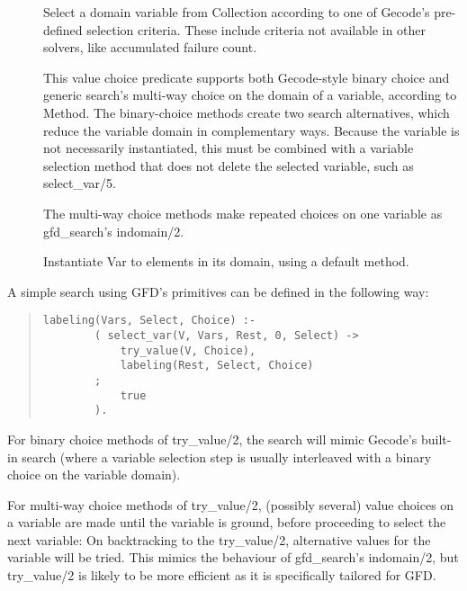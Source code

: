 \begin{description}
\item[]
Select a domain variable from Collection according to one of Gecode's
pre-defined selection criteria.  These include criteria not available in
other {\eclipse} solvers, like accumulated failure count.

\item[]
This value choice predicate supports both Gecode-style binary choice and 
generic search's multi-way choice on the domain of a variable,
according to Method.
The binary-choice methods create two search alternatives, which reduce the variable domain
in complementary ways.  Because the variable is not necessarily instantiated,
this must be combined with a variable selection method that does not delete
the selected variable, such as select_var/5.

The multi-way choice methods make repeated choices on one variable as 
gfd_search's indomain/2.

\item[]
Instantiate Var to elements in its domain, using a default method.

\end{description}

A simple search using GFD's primitives can be defined in the following way: 
\begin{quote}
\begin{verbatim}
labeling(Vars, Select, Choice) :-
        ( select_var(V, Vars, Rest, 0, Select) ->
            try_value(V, Choice),
            labeling(Rest, Select, Choice)
        ;
            true
        ).
\end{verbatim}
\end{quote}
For binary choice methods of try_value/2, the search will 
mimic Gecode's built-in search (where a variable selection step is usually
interleaved with a binary choice on the variable domain).

For multi-way choice methods of try_value/2,  
(possibly several) value choices on a variable are made until the
variable is ground, before proceeding to select the next variable: On
backtracking to the try_value/2, alternative values for the variable
will be tried. This mimics the behaviour of gfd_search's indomain/2,
but try_value/2 is likely to be more efficient as it is specifically
tailored for GFD.

